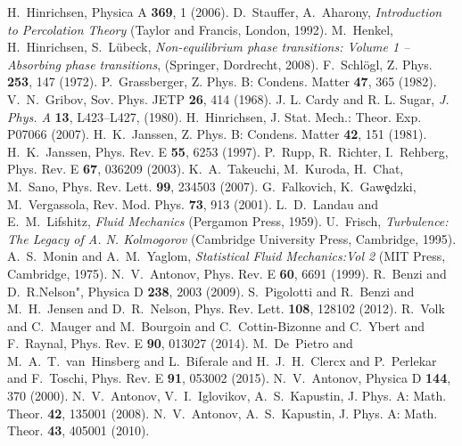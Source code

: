 %
%
\begin{thebibliography}{99}
  H.~Hinrichsen, Physica A {\bf 369}, 1 (2006).
  D.~Stauffer, A.~Aharony, {\it Introduction to Percolation Theory}
     (Taylor and Francis, London, 1992).
  M.~Henkel, H.~Hinrichsen, S.~L{\"u}beck, 
     {\it Non-equilibrium phase transitions: Volume 1 – Absorbing phase transitions}, 
     (Springer, Dordrecht, 2008).
  F.~Schl\"ogl, Z. Phys. {\bf 253}, 147 (1972).
  P.~Grassberger, Z. Phys. B: Condens. Matter {\bf 47}, 365 (1982).
  V.~N.~Gribov, Sov. Phys. JETP {\bf 26}, 414 (1968).    
  J. L. Cardy and R. L. Sugar, \emph{ J. Phys. A} {\bf 13}, L423–L427, (1980).
  H.~Hinrichsen, J. Stat. Mech.: Theor. Exp. P07066 (2007).
  H.~K.~Janssen, Z. Phys. B: Condens. Matter {\bf 42}, 151 (1981).
  H.~K.~Janssen, Phys. Rev. E {\bf 55}, 6253 (1997).
  P.~Rupp, R.~Richter, I.~Rehberg, Phys. Rev. E {\bf 67}, 036209 (2003).
  K.~A.~Takeuchi, M.~Kuroda, H.~Chat, M.~Sano, Phys. Rev. Lett. {\bf 99}, 234503 (2007).
  G.~Falkovich, K.~Gaw\c{e}dzki, M.~Vergassola, Rev. Mod. Phys. {\bf 73}, 913 (2001). 
  L.~D.~Landau and E.~M.~Lifshitz, {\it Fluid Mechanics} (Pergamon Press, 1959).
  U.~Frisch, {\it Turbulence: The Legacy of A. N. Kolmogorov} (Cambridge University Press, Cambridge, 1995). 
  A.~S.~Monin and A.~M.~Yaglom, {\it Statistical Fluid Mechanics:Vol 2}
    (MIT Press, Cambridge, 1975). 
  N.~V.~Antonov, Phys. Rev. E {\bf 60}, 6691 (1999).
  R.~Benzi and D.~R.Nelson", Physica D {\bf 238}, 2003 (2009).
  S.~Pigolotti and R.~Benzi and M.~H.~Jensen and D.~R.~Nelson, 
    Phys. Rev. Lett. {\bf 108}, 128102 (2012).
  R.~Volk and C.~Mauger and M.~Bourgoin and C.~Cottin-Bizonne
	      and C.~Ybert and F.~Raynal, Phys. Rev. E {\bf 90}, 013027 (2014).
  M.~De~Pietro and M.~A.~T.~van~Hinsberg and L.~Biferale and
	      H.~J.~H.~Clercx and P.~Perlekar and F.~Toschi, Phys. Rev. E {\bf 91}, 053002 (2015).
  N.~V.~Antonov, Physica D {\bf 144}, 370 (2000).
  N.~V.~Antonov, V.~I.~Iglovikov, A.~S.~Kapustin, J. Phys. A: Math. Theor. {\bf 42}, 135001 (2008).
  N.~V.~Antonov, A.~S.~Kapustin, J. Phys. A: Math. Theor. {\bf 43}, 405001 (2010).

\end{thebibliography}
